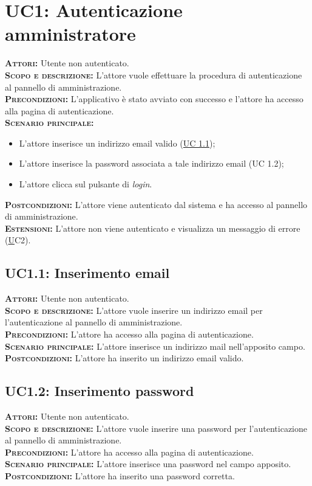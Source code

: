 \setlength{\parindent}{0cm}
\section{UC1: Autenticazione amministratore}
\label{sec:uc1}
\textsc{\textsc{\textbf{Attori:}}} Utente non autenticato.\\
\textsc{\textbf{Scopo e descrizione:}} L'attore vuole effettuare la procedura di autenticazione al pannello di amministrazione.\\
\textsc{\textsc{\textbf{Precondizioni:}}} L'applicativo è stato avviato con successo e l'attore ha accesso alla pagina di autenticazione.\\
\textsc{\textbf{Scenario principale:}}
\begin{itemize}
    \item L'attore inserisce un indirizzo email valido (\hyperref[sec:uc11]{UC 1.1});
    \item L'attore inserisce la password associata a tale indirizzo email (UC 1.2);
    \item L'attore clicca sul pulsante di \textit{login}.
\end{itemize}
\textsc{\textbf{Postcondizioni:}} L'attore viene autenticato dal sistema e ha accesso al pannello di amministrazione.\\
\textsc{\textbf{Estensioni:}} L'attore non viene autenticato e visualizza un messaggio di errore (\hyperref[sec:uc2]UC2{}).

\subsection{UC1.1: Inserimento email}
\label{sec:uc11}
\textsc{\textbf{Attori:}} Utente non autenticato.\\
\textsc{\textbf{Scopo e descrizione:}} L'attore vuole inserire un indirizzo email per l'autenticazione al pannello di amministrazione.\\
\textsc{\textsc{\textbf{Precondizioni:}}} L'attore ha accesso alla pagina di autenticazione.\\
\textsc{\textbf{Scenario principale:}} L'attore inserisce un indirizzo mail nell'apposito campo.\\
\textsc{\textbf{Postcondizioni:}} L'attore ha inserito un indirizzo email valido.

\subsection{UC1.2: Inserimento password}
\label{sec:uc12}
\textsc{\textbf{Attori:}} Utente non autenticato.\\
\textsc{\textbf{Scopo e descrizione:}} L'attore vuole inserire una password per l'autenticazione al pannello di amministrazione.\\
\textsc{\textsc{\textbf{Precondizioni:}}} L'attore ha accesso alla pagina di autenticazione.\\
\textsc{\textbf{Scenario principale:}} L'attore inserisce una password nel campo apposito.\\
\textsc{\textbf{Postcondizioni:}} L'attore ha inserito una password corretta.

